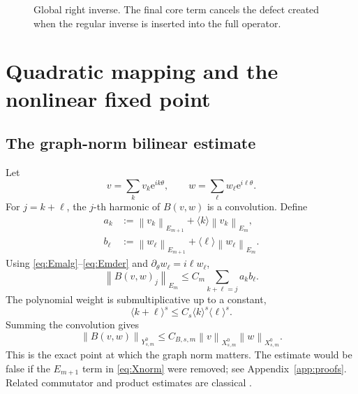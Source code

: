 \documentclass[11pt]{article}
\numberwithin{equation}{section}
\newcommand{\norm}[1]{\left\lVert #1\right\rVert}
\newcommand{\e}{\mathrm e}
\begin{document}
\begin{figure}[ht]
\centering
{}

\caption{Global right inverse.  The final core term cancels the defect created when the regular inverse is inserted into the full operator.}
\label{fig:blockinverse}
\end{figure}

\section{Quadratic mapping and the nonlinear fixed point}\label{sec:nonlinear}

\subsection{The graph-norm bilinear estimate}
Let
\[
v=\sum_kv_k\e^{ik\theta},
\qquad
w=\sum_\ell w_\ell\e^{i\ell\theta}.
\]
For \(j=k+\ell\), the \(j\)-th harmonic of \(B(v,w)\) is a convolution.  Define
\begin{align}
a_k&:=\norm{v_k}_{E_{m+1}}+\langle k\rangle\norm{v_k}_{E_m},\label{eq:ak}\\
b_\ell&:=\norm{w_\ell}_{E_{m+1}}+\langle \ell\rangle\norm{w_\ell}_{E_m}.\label{eq:bl}
\end{align}
Using \eqref{eq:Emalg}--\eqref{eq:Emder} and \(\partial_\theta w_\ell=i\ell w_\ell\),
\begin{equation}
\norm{B(v,w)_j}_{E_m}
\le C_m\sum_{k+\ell=j}a_kb_\ell.
\label{eq:modeproduct}
\end{equation}
The polynomial weight is submultiplicative up to a constant,
\begin{equation}
\langle k+\ell\rangle^s
\le C_s\langle k\rangle^s\langle\ell\rangle^s.
\label{eq:weightconv}
\end{equation}
Summing the convolution gives
\begin{equation}
\boxed{
\norm{B(v,w)}_{Y^0_{s,m}}
\le C_{B,s,m}\norm v_{X^0_{s,m}}\norm w_{X^0_{s,m}}.}
\label{eq:bilbound}
\end{equation}
This is the exact point at which the graph norm matters.  The estimate would be false if the \(E_{m+1}\) term in \eqref{eq:Xnorm} were removed; see Appendix~\ref{app:proofs}.  Related commutator and product estimates are classical \cite{KatoPonce1988}.
\end{document}
